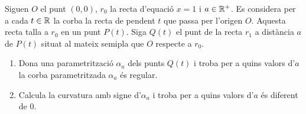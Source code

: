 \documentclass[a4paper, 11pt]{article}
\begin{document}
  \begin{exercise}
    Siguen $O$ el punt $(0, 0)$, $r_0$ la recta d'equació $x=1$ i $a \in
    \mathbb{R}^+$. Es considera per a cada $t \in \mathbb{R}$ la corba la recta de
    pendent $t$ que passa per l'origen $O$. Aquesta recta talla a $r_0$ en
    un punt $P(t)$. Siga $Q(t)$ el punt de la recta $r_1$ a distància $a$
    de $P(t)$ situat al mateix semipla que $O$ respecte a $r_0$.

    \begin{enumerate}[label=(\alph*)]
      \item Dona una parametrització $\alpha_a$ dels punts $Q(t)$ i troba
      per a quins valors d'$a$ la corba parametritzada $\alpha_a$ és
      regular.
      \item Calcula la curvatura amb signe d'$\alpha_a$ i troba per a quins
      valors d'$a$ és diferent de $0$.
    \end{enumerate}
  \end{exercise}
\end{document}
